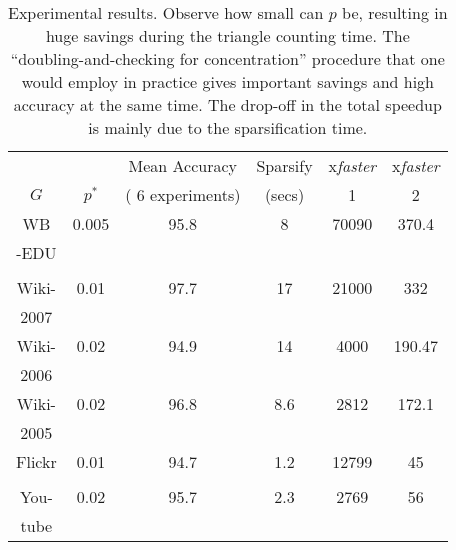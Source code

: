 \documentclass{llncs}
\begin{document}
\begin{table}[ht]
\begin{center}
\begin{tabular}{c|c|c|c|c|c}\hline \hline 
       &         &     Mean Accuracy                &  Sparsify          &  x\it{faster}     &  x\it{faster}            \\ 
$G$    &$p^{*}$  &    ( 6 experiments)     &  (secs)            &  1                &     2                     \\ \hline \hline
WB     &0.005 & 95.8                            &  8                 & 70090             &  370.4                      \\
-EDU   &      &                                 &                    &                   &  														\\ 
       &      &                                 &                    &                   &                               \\ \hline
Wiki-  & 0.01 & 97.7                            &  17                & 21000             &  332                           \\
2007   &      &                                 &                    &                   &                                 \\ \hline
Wiki-  & 0.02 & 94.9                            &  14                & 4000              &  190.47                                \\
2006   &      &                                 &                    &                   &                                   \\ \hline
Wiki-  & 0.02 & 96.8                            &  8.6               & 2812              &  172.1                             \\
2005   &      &                                 &                    &                   &                                     \\ \hline
Flickr & 0.01 & 94.7                            &  1.2               & 12799             &  45                                  \\
       &      &                                 &                    &                   &                                       \\    \hline
You-   & 0.02 & 95.7                            &  2.3               & 2769              &  56                                    \\     
tube   &      &                                 &                    &                   &                                         \\ \hline \hline 
\end{tabular}
\end{center}
\caption{ Experimental results. Observe how small can $p$ be, resulting in huge savings during the triangle counting time. The 
``doubling-and-checking for concentration'' procedure that one would employ in practice gives important savings and high accuracy
at the same time. The drop-off in the total speedup is mainly due to the sparsification time.  }
\label{tab:results}
\end{table}
\end{document}

